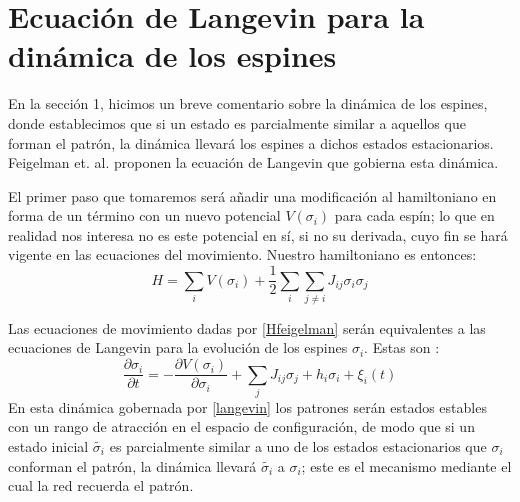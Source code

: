 \documentclass[titlepage,12pt]{article}
\numberwithin{equation}{section}
\begin{document}
	\section{Ecuación de Langevin para la dinámica de los espines}
	En la sección 1, hicimos un breve comentario sobre la dinámica de los espines, donde establecimos que si un estado es parcialmente similar a aquellos que forman el patrón, la dinámica llevará los espines a dichos estados estacionarios. Feigelman et. al. \cite{feigelman86} proponen la ecuación de Langevin que gobierna esta dinámica. 
	
	El primer paso que tomaremos será añadir una modificación al hamiltoniano en forma de un término con un nuevo potencial $V(\sigma_i)$ para cada espín; lo que en realidad nos interesa no es este potencial en sí, si no su derivada, cuyo fin se hará vigente en las ecuaciones del movimiento. Nuestro hamiltoniano es entonces:
	\begin{equation}
	H = \sum_i V(\sigma_i) + \frac{1}{2}\sum_{i}\sum_{j\neq i}J_{ij}\sigma_i\sigma_j
	\label{Hfeigelman}
	\end{equation}
	
	Las ecuaciones de movimiento dadas por \eqref{Hfeigelman} serán equivalentes a las ecuaciones de Langevin para la evolución de los espines $\sigma_i$. Estas son \cite{feigelman86}:
	\begin{equation}
	\frac{\partial\sigma_i}{\partial t} = -\frac{\partial V(\sigma_i)}{\partial\sigma_i} + \sum_j J_{ij}\sigma_j + h_i\sigma_i + \xi_i(t)
	\label{langevin}
	\end{equation}
	En esta dinámica gobernada por \eqref{langevin} los patrones serán estados estables con un rango de atracción en el espacio de configuración, de modo que si un estado inicial $\tilde{\sigma_i}$ es parcialmente similar a uno de los estados estacionarios que $\sigma_i$ conforman el patrón, la dinámica llevará $\tilde{\sigma_i}$ a $\sigma_i$; este es el mecanismo mediante el cual la red recuerda el patrón.\\
	
\end{document}
